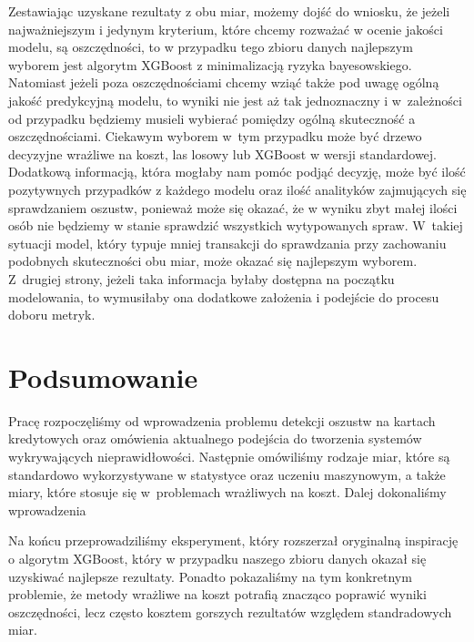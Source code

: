 \documentclass[inzynierska]{pwr_wmat_praca_dyplomowa}
\theoremstyle{plain}
\numberwithin{theorem}{chapter}
\theoremstyle{definition}
\numberwithin{theorem}{chapter}
\begin{document}
Zestawiając uzyskane rezultaty z obu miar, możemy dojść do wniosku, że jeżeli najważniejszym i jedynym kryterium, które chcemy rozważać w ocenie jakości modelu, są oszczędności, to w przypadku tego zbioru danych najlepszym wyborem jest algorytm XGBoost z minimalizacją ryzyka bayesowskiego. Natomiast jeżeli poza oszczędnościami chcemy wziąć także pod uwagę ogólną jakość predykcyjną modelu, to wyniki nie jest aż tak jednoznaczny i w~zależności od przypadku będziemy musieli wybierać pomiędzy ogólną skuteczność a oszczędnościami. Ciekawym wyborem w~tym przypadku może być drzewo decyzyjne wrażliwe na koszt, las losowy lub XGBoost w wersji standardowej. Dodatkową informacją, która mogłaby nam pomóc podjąć decyzję, może być ilość pozytywnych przypadków z każdego modelu oraz ilość analityków zajmujących się sprawdzaniem oszustw, ponieważ może się okazać, że w wyniku zbyt małej ilości osób nie będziemy w stanie sprawdzić wszystkich wytypowanych spraw. W~takiej sytuacji model, który typuje mniej transakcji do sprawdzania przy zachowaniu podobnych skuteczności obu miar, może okazać się najlepszym wyborem. Z~drugiej strony, jeżeli taka informacja byłaby dostępna na początku modelowania, to wymusiłaby ona dodatkowe założenia i podejście do procesu doboru metryk.

\chapter*{Podsumowanie}
Pracę rozpoczęliśmy od wprowadzenia problemu detekcji oszustw na kartach kredytowych oraz omówienia aktualnego podejścia do tworzenia systemów wykrywających nieprawidłowości. Następnie omówiliśmy rodzaje miar, które są standardowo wykorzystywane w statystyce oraz uczeniu maszynowym, a także miary, które stosuje się w~problemach wrażliwych na koszt. Dalej dokonaliśmy wprowadzenia 

Na końcu przeprowadziliśmy eksperyment, który rozszerzał oryginalną inspirację o algorytm XGBoost, który w przypadku naszego zbioru danych okazał się uzyskiwać najlepsze rezultaty. Ponadto pokazaliśmy na tym konkretnym problemie, że metody wrażliwe na koszt potrafią znacząco poprawić wyniki oszczędności, lecz często kosztem gorszych rezultatów względem standradowych miar.

\backmatter
\nocite{*}

\end{document}
